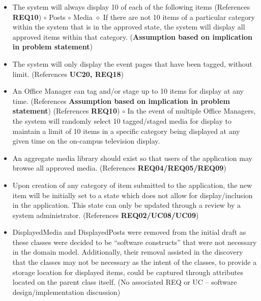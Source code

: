 \documentclass{article}
\begin{document}
\begin{itemize}
    \item The system will always display 10 of each of the following items (References \textbf{REQ10})
          \subitem$\circ$ Posts
          \subitem$\circ$ Media
          \subsubitem$\diamond$ If there are not 10 items of a particular category within the system that is in the approved state, the system will display all approved items within that category. (\textbf{Assumption based on implication in problem statement})
    \item The system will only display the event pages that have been tagged, without limit. (References \textbf{UC20, REQ18})
    \item An Office Manager can tag and/or stage up to 10 items for display at any time. (References \textbf{Assumption based on implication in problem statement}) (References \textbf{REQ10})
          \subitem$\circ$ In the event of multiple Office Managers, the system will randomly select 10 tagged/staged media for display to maintain a limit of 10 items in a specific category being displayed at any given time on the on-campus television display.
    \item An aggregate media library should exist so that users of the application may browse all approved media. (References \textbf{REQ04/REQ05/REQ09})
    \item Upon creation of any category of item submitted to the application, the new item will be initially set to a state which does not allow for display/inclusion in the application. This state can only be updated through a review by a system administrator. (References \textbf{REQ02/UC08/UC09})
    \item DisplayedMedia and DisplayedPosts were removed from the initial draft as these classes were decided to be “software constructs” that were not necessary in the domain model. Additionally, their removal assisted in the discovery that the classes may not be necessary as the intent of the classes, to provide a storage location for displayed items, could be captured through attributes located on the parent class itself. (No associated REQ or UC – software design/implementation discussion)
\end{itemize}
\end{document}
